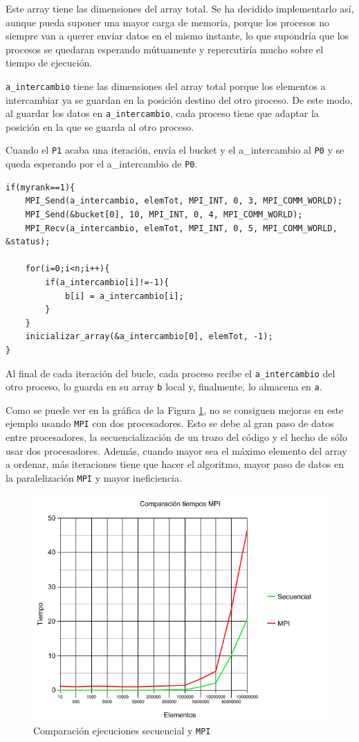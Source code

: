 Este array tiene las dimensiones del array total. Se ha decidido implementarlo así, aunque pueda suponer una mayor carga de memoria, porque los procesos no siempre van a querer enviar datos en el mismo instante, lo que supondría que los procesos se quedaran esperando mútuamente y repercutiría mucho sobre el tiempo de ejecución.

\texttt{a\_intercambio} tiene las dimensiones del array total porque los elementos a intercambiar ya se guardan en la posición destino del otro proceso. De este modo, al guardar los datos en \texttt{a\_intercambio}, cada proceso tiene que adaptar la posición en la que se guarda al otro proceso.


Cuando el \texttt{P1} acaba una iteración, envía el bucket y el a\_intercambio al \texttt{P0} y se queda esperando por el a\_intercambio de \texttt{P0}.
\begin{lstlisting}[frame=single]
if(myrank==1){
	MPI_Send(a_intercambio, elemTot, MPI_INT, 0, 3, MPI_COMM_WORLD);
	MPI_Send(&bucket[0], 10, MPI_INT, 0, 4, MPI_COMM_WORLD);
	MPI_Recv(a_intercambio, elemTot, MPI_INT, 0, 5, MPI_COMM_WORLD, &status);

	for(i=0;i<n;i++){
		if(a_intercambio[i]!=-1){
			b[i] = a_intercambio[i];
		}
	}
	inicializar_array(&a_intercambio[0], elemTot, -1);
}
\end{lstlisting}

Al final de cada iteración del bucle, cada proceso recibe el \texttt{a\_intercambio} del otro proceso, lo guarda en su array \texttt{b} local y, finalmente, lo almacena en \texttt{a}.


Como se puede ver en la gráfica de la Figura \ref{grafica_mpi}, no se consiguen mejoras en este ejemplo usando \texttt{MPI} con dos procesadores. Esto se debe al gran paso de datos entre procesadores, la secuencialización de un trozo del código y el hecho de sólo usar dos procesadores. Además, cuando mayor sea el máximo elemento del array a ordenar, más iteraciones tiene que hacer el algoritmo, mayor paso de datos en la paralelización \texttt{MPI} y mayor ineficiencia.

\begin{figure}[h!]
	\centering
	
	\includegraphics[width=1\textwidth]{./res/grafica_mpi}
	\caption{Comparación ejecuciones secuencial y \texttt{MPI}}
	\label{grafica_mpi}
\end{figure}
